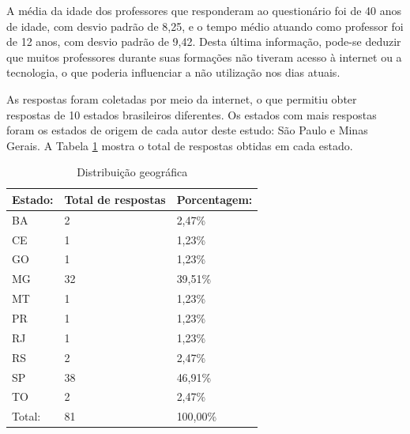 A média da idade dos professores que responderam ao questionário foi de 40 anos de idade, com desvio padrão de 8,25, e o tempo médio atuando como professor foi de 12 anos, com desvio padrão de 9,42. Desta última informação, pode-se deduzir que muitos professores durante suas formações não tiveram acesso à internet ou a tecnologia, o que poderia influenciar a não utilização nos dias atuais.

As respostas foram coletadas por meio da internet, o que permitiu obter respostas de 10 estados brasileiros diferentes. Os estados com mais respostas foram os estados de origem de cada autor deste estudo: São Paulo e Minas Gerais.
A Tabela \ref{tab:distribuicao_geografica} mostra o total de respostas obtidas em cada estado.

\bgroup
\def\arraystretch{1.5} %
\begin{table}[h]{} %
\centering
\caption{Distribuição geográfica}
\begin{tabular}{ | p{3cm} | p{5cm}| p{5cm}| } \hline
\textbf{Estado:} & \textbf{Total de respostas} & \textbf{Porcentagem: } \\ \hline
BA & 2 & 2,47\% \\ \hline
CE & 1 & 1,23\% \\ \hline
GO & 1 & 1,23\% \\ \hline
MG & 32 & 39,51\% \\ \hline
MT & 1 & 1,23\% \\ \hline
PR & 1 & 1,23\% \\ \hline
RJ & 1 & 1,23\% \\ \hline
RS & 2 & 2,47\% \\ \hline
SP & 38 & 46,91\% \\ \hline
TO & 2 & 2,47\% \\ \hline
Total: & 81 & 100,00\% \\ \hline
\end{tabular}
\label{tab:distribuicao_geografica}
\end{table}
\egroup


